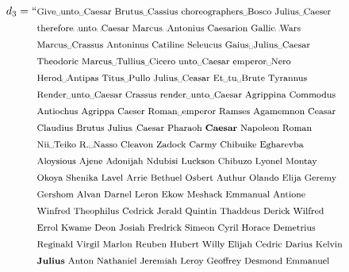 \documentclass[
  digital, %
  notable, %
  lof,     %
  lot,     %
  nopalatino, color
]{fithesis3}
\begin{document}
\begin{align*}
  d_3 = \text{``}&\text{\footnotesize Give\textvisiblespace{}unto\textvisiblespace{}Caesar Brutus\textvisiblespace{}Cassius choreographers\textvisiblespace{}Bosco Julius\textvisiblespace{}Caeser}\index{.d3@$d_3$|emph} \\
  &\text{\footnotesize therefore\textvisiblespace{}unto\textvisiblespace{}Caesar Marcus\textvisiblespace{}Antonius Caesarion
    Gallic\textvisiblespace{}Wars} \\
  &\text{\footnotesize Marcus\textvisiblespace{}Crassus Antoninus Catiline Seleucus
    Gaius\textvisiblespace{}Julius\textvisiblespace{}Caesar} \\
  &\text{\footnotesize Theodoric Marcus\textvisiblespace{}Tullius\textvisiblespace{}Cicero unto\textvisiblespace{}Caesar
    emperor\textvisiblespace{}Nero} \\
  &\text{\footnotesize Herod\textvisiblespace{}Antipas Titus\textvisiblespace{}Pullo Julius\textvisiblespace{}Ceasar Et\textvisiblespace{}tu\textvisiblespace{}Brute Tyrannus} \\
  &\text{\footnotesize Render\textvisiblespace{}unto\textvisiblespace{}Caesar Crassus render\textvisiblespace{}unto\textvisiblespace{}Caesar Agrippina Commodus} \\
  &\text{\footnotesize Antiochus Agrippa Caeser Roman\textvisiblespace{}emperor Ramses Agamemnon
  Ceasar} \\
  &\text{\footnotesize Claudius Brutus Julius\textvisiblespace{}Caesar Pharaoh \textbf{Caesar} Napoleon Roman} \\
  &\text{\footnotesize Nii\textvisiblespace{}Teiko R.\textvisiblespace{}Nasso Cleavon Zadock Carmy Chibuike Egharevba} \\
  &\text{\footnotesize Aloysious Ajene Adonijah Ndubisi Luckson Chibuzo Lyonel
    Montay} \\
  &\text{\footnotesize Okoya Shenika Lavel Arrie Bethuel Osbert Authur Olando
    Elija Geremy} \\
  &\text{\footnotesize Gershom Alvan Darnel Leron Ekow Meshack Emmanual Antione} \\
  &\text{\footnotesize Winfred Theophilus Cedrick Jerald Quintin Thaddeus Derick Wilfred} \\
  &\text{\footnotesize Errol Kwame Deon Josiah Fredrick Simeon Cyril Horace Demetrius} \\
  &\text{\footnotesize Reginald Virgil Marlon Reuben Hubert Willy Elijah Cedric Darius Kelvin} \\
  &\text{\footnotesize \textbf{Julius} Anton Nathaniel Jeremiah Leroy Geoffrey Desmond Emmanuel} \\

\end{align*}
\end{document}
